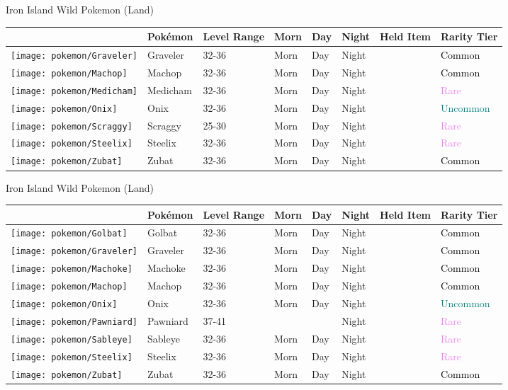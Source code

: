 \caption{Iron Island Wild Pokemon (Land)}%
\begin{longtable}{||l l l l l l l l||}%
\hline%
&Pokémon&Level Range&Morn&Day&Night&Held Item&Rarity Tier\\%
\hline%
\endhead%
\hline%
\texttt{[image: pokemon/Graveler]}&Graveler&32{-}36&Morn&Day&Night&&\textcolor{black}{%
Common%
}\\%
\hline%
\texttt{[image: pokemon/Machop]}&Machop&32{-}36&Morn&Day&Night&&\textcolor{black}{%
Common%
}\\%
\hline%
\texttt{[image: pokemon/Medicham]}&Medicham&32{-}36&Morn&Day&Night&&\textcolor{violet}{%
Rare%
}\\%
\hline%
\texttt{[image: pokemon/Onix]}&Onix&32{-}36&Morn&Day&Night&&\textcolor{teal}{%
Uncommon%
}\\%
\hline%
\texttt{[image: pokemon/Scraggy]}&Scraggy&25{-}30&Morn&Day&Night&&\textcolor{violet}{%
Rare%
}\\%
\hline%
\texttt{[image: pokemon/Steelix]}&Steelix&32{-}36&Morn&Day&Night&&\textcolor{violet}{%
Rare%
}\\%
\hline%
\texttt{[image: pokemon/Zubat]}&Zubat&32{-}36&Morn&Day&Night&&\textcolor{black}{%
Common%
}\\%
\hline%
\end{longtable}%
\caption{Iron Island Wild Pokemon (Land)}%
\begin{longtable}{||l l l l l l l l||}%
\hline%
&Pokémon&Level Range&Morn&Day&Night&Held Item&Rarity Tier\\%
\hline%
\endhead%
\hline%
\texttt{[image: pokemon/Golbat]}&Golbat&32{-}36&Morn&Day&Night&&\textcolor{black}{%
Common%
}\\%
\hline%
\texttt{[image: pokemon/Graveler]}&Graveler&32{-}36&Morn&Day&Night&&\textcolor{black}{%
Common%
}\\%
\hline%
\texttt{[image: pokemon/Machoke]}&Machoke&32{-}36&Morn&Day&Night&&\textcolor{black}{%
Common%
}\\%
\hline%
\texttt{[image: pokemon/Machop]}&Machop&32{-}36&Morn&Day&Night&&\textcolor{black}{%
Common%
}\\%
\hline%
\texttt{[image: pokemon/Onix]}&Onix&32{-}36&Morn&Day&Night&&\textcolor{teal}{%
Uncommon%
}\\%
\hline%
\texttt{[image: pokemon/Pawniard]}&Pawniard&37{-}41&&&Night&&\textcolor{violet}{%
Rare%
}\\%
\hline%
\texttt{[image: pokemon/Sableye]}&Sableye&32{-}36&Morn&Day&Night&&\textcolor{violet}{%
Rare%
}\\%
\hline%
\texttt{[image: pokemon/Steelix]}&Steelix&32{-}36&Morn&Day&Night&&\textcolor{violet}{%
Rare%
}\\%
\hline%
\texttt{[image: pokemon/Zubat]}&Zubat&32{-}36&Morn&Day&Night&&\textcolor{black}{%
Common%
}\\%
\hline%
\end{longtable}%
